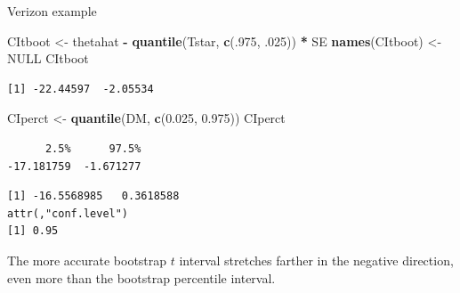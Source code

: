 \documentclass[
  ignorenonframetext,
]{beamer}
\newenvironment{Shaded}{\begin{snugshade}}{\end{snugshade}}
\newcommand{\ConstantTok}[1]{\textcolor[rgb]{0.56,0.35,0.01}{#1}}
\newcommand{\DecValTok}[1]{\textcolor[rgb]{0.00,0.00,0.81}{#1}}
\newcommand{\FloatTok}[1]{\textcolor[rgb]{0.00,0.00,0.81}{#1}}
\newcommand{\FunctionTok}[1]{\textcolor[rgb]{0.13,0.29,0.53}{\textbf{#1}}}
\newcommand{\NormalTok}[1]{#1}
\newcommand{\OtherTok}[1]{\textcolor[rgb]{0.56,0.35,0.01}{#1}}
\newcommand{\SpecialCharTok}[1]{\textcolor[rgb]{0.81,0.36,0.00}{\textbf{#1}}}
\begin{document}
\begin{frame}[fragile]{Verizon example}
\protect\hypertarget{verizon-example-1}{}
\tiny

\begin{Shaded}
\begin{Highlighting}[]
\NormalTok{CItboot }\OtherTok{\textless{}{-}}\NormalTok{ thetahat }\SpecialCharTok{{-}} \FunctionTok{quantile}\NormalTok{(Tstar, }\FunctionTok{c}\NormalTok{(.}\DecValTok{975}\NormalTok{, .}\DecValTok{025}\NormalTok{)) }\SpecialCharTok{*}\NormalTok{ SE}
\FunctionTok{names}\NormalTok{(CItboot) }\OtherTok{\textless{}{-}} \ConstantTok{NULL}
\NormalTok{CItboot}
\end{Highlighting}
\end{Shaded}

\begin{verbatim}
[1] -22.44597  -2.05534
\end{verbatim}

\begin{Shaded}
\begin{Highlighting}[]
\NormalTok{CIperct }\OtherTok{\textless{}{-}} \FunctionTok{quantile}\NormalTok{(DM, }\FunctionTok{c}\NormalTok{(}\FloatTok{0.025}\NormalTok{, }\FloatTok{0.975}\NormalTok{))}
\NormalTok{CIperct}
\end{Highlighting}
\end{Shaded}

\begin{verbatim}
      2.5%      97.5% 
-17.181759  -1.671277 
\end{verbatim}

\begin{Shaded}
\end{Shaded}

\begin{verbatim}
[1] -16.5568985   0.3618588
attr(,"conf.level")
[1] 0.95
\end{verbatim}

\normalsize

The more accurate bootstrap \(t\) interval stretches farther in the
negative direction, even more than the bootstrap percentile interval.
\end{frame}
\end{document}
